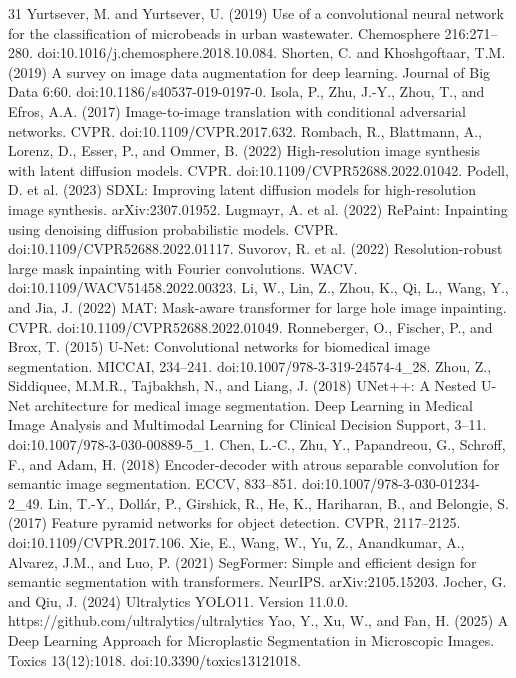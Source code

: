 \documentclass[11pt]{article}
\begin{document}
\begin{thebibliography}{31}
 Yurtsever, M. and Yurtsever, U. (2019) Use of a convolutional neural network for the classification of microbeads in urban wastewater. Chemosphere 216:271--280. doi:10.1016/j.chemosphere.2018.10.084.
 Shorten, C. and Khoshgoftaar, T.M. (2019) A survey on image data augmentation for deep learning. Journal of Big Data 6:60. doi:10.1186/s40537-019-0197-0.
 Isola, P., Zhu, J.-Y., Zhou, T., and Efros, A.A. (2017) Image-to-image translation with conditional adversarial networks. CVPR. doi:10.1109/CVPR.2017.632.
 Rombach, R., Blattmann, A., Lorenz, D., Esser, P., and Ommer, B. (2022) High-resolution image synthesis with latent diffusion models. CVPR. doi:10.1109/CVPR52688.2022.01042.
 Podell, D. et al. (2023) SDXL: Improving latent diffusion models for high-resolution image synthesis. arXiv:2307.01952.
 Lugmayr, A. et al. (2022) RePaint: Inpainting using denoising diffusion probabilistic models. CVPR. doi:10.1109/CVPR52688.2022.01117.
 Suvorov, R. et al. (2022) Resolution-robust large mask inpainting with Fourier convolutions. WACV. doi:10.1109/WACV51458.2022.00323.
 Li, W., Lin, Z., Zhou, K., Qi, L., Wang, Y., and Jia, J. (2022) MAT: Mask-aware transformer for large hole image inpainting. CVPR. doi:10.1109/CVPR52688.2022.01049.
 Ronneberger, O., Fischer, P., and Brox, T. (2015) U-Net: Convolutional networks for biomedical image segmentation. MICCAI, 234--241. doi:10.1007/978-3-319-24574-4\_28.
 Zhou, Z., Siddiquee, M.M.R., Tajbakhsh, N., and Liang, J. (2018) UNet++: A Nested U-Net architecture for medical image segmentation. Deep Learning in Medical Image Analysis and Multimodal Learning for Clinical Decision Support, 3--11. doi:10.1007/978-3-030-00889-5\_1.
 Chen, L.-C., Zhu, Y., Papandreou, G., Schroff, F., and Adam, H. (2018) Encoder-decoder with atrous separable convolution for semantic image segmentation. ECCV, 833--851. doi:10.1007/978-3-030-01234-2\_49.
 Lin, T.-Y., Dollár, P., Girshick, R., He, K., Hariharan, B., and Belongie, S. (2017) Feature pyramid networks for object detection. CVPR, 2117--2125. doi:10.1109/CVPR.2017.106.
 Xie, E., Wang, W., Yu, Z., Anandkumar, A., Alvarez, J.M., and Luo, P. (2021) SegFormer: Simple and efficient design for semantic segmentation with transformers. NeurIPS. arXiv:2105.15203.
 Jocher, G. and Qiu, J. (2024) Ultralytics YOLO11. Version 11.0.0. https://github.com/ultralytics/ultralytics
 Yao, Y., Xu, W., and Fan, H. (2025) A Deep Learning Approach for Microplastic Segmentation in Microscopic Images. Toxics 13(12):1018. doi:10.3390/toxics13121018.

\end{thebibliography}
\end{document}
